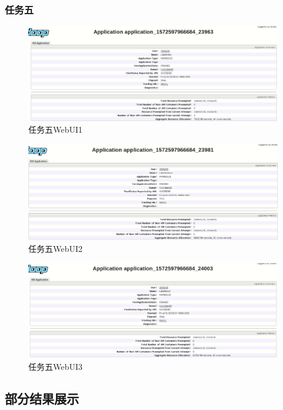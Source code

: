 \documentclass[a4paper,UTF8]{article}
\numberwithin{equation}{section}
\begin{document}
\subsubsection{任务五}
\begin{figure}[H]
    \centering
    \includegraphics[width = 15cm]{task5-1-success.png}
    \caption{任务五WebUI1}
\end{figure}
\begin{figure}[H]
    \centering
    \includegraphics[width = 15cm]{task5-2-success.png}
    \caption{任务五WebUI2}
\end{figure}
\begin{figure}[H]
    \centering
    \includegraphics[width = 15cm]{task5-3-success.png}
    \caption{任务五WebUI3}
\end{figure}

\subsection{部分结果展示}
\end{document}
